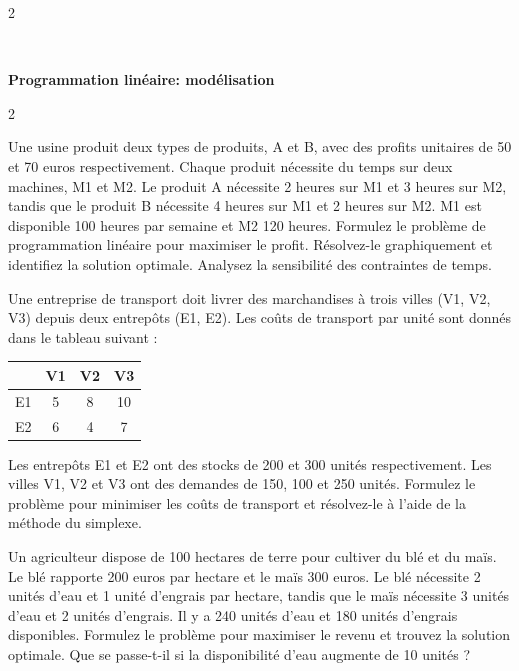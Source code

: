 \begin{multicols}{2}
\end{multicols}
\quad\\
\begin{center}
\textbf{{\large Programmation linéaire: modélisation}}
\end{center}
\begin{multicols}{2}

\begin{exercice}
	Une usine produit deux types de produits, A et B, avec des profits unitaires de 50 et 70 euros respectivement. Chaque produit nécessite du temps sur deux machines, M1 et M2. Le produit A nécessite 2 heures sur M1 et 3 heures sur M2, tandis que le produit B nécessite 4 heures sur M1 et 2 heures sur M2. M1 est disponible 100 heures par semaine et M2 120 heures. Formulez le problème de programmation linéaire pour maximiser le profit. Résolvez-le graphiquement et identifiez la solution optimale. Analysez la sensibilité des contraintes de temps.
\end{exercice}

\begin{exercice}
	Une entreprise de transport doit livrer des marchandises à trois villes (V1, V2, V3) depuis deux entrepôts (E1, E2). Les coûts de transport par unité sont donnés dans le tableau suivant :
	\begin{center}
		\begin{tabular}{c|ccc}
			& V1 & V2 & V3 \\
			\hline
			E1 & 5 & 8 & 10 \\
			E2 & 6 & 4 & 7 \\
		\end{tabular}
	\end{center}
	Les entrepôts E1 et E2 ont des stocks de 200 et 300 unités respectivement. Les villes V1, V2 et V3 ont des demandes de 150, 100 et 250 unités. Formulez le problème pour minimiser les coûts de transport et résolvez-le à l'aide de la méthode du simplexe.
\end{exercice}

\begin{exercice}
	Un agriculteur dispose de 100 hectares de terre pour cultiver du blé et du maïs. Le blé rapporte 200 euros par hectare et le maïs 300 euros. Le blé nécessite 2 unités d'eau et 1 unité d'engrais par hectare, tandis que le maïs nécessite 3 unités d'eau et 2 unités d'engrais. Il y a 240 unités d'eau et 180 unités d'engrais disponibles. Formulez le problème pour maximiser le revenu et trouvez la solution optimale. Que se passe-t-il si la disponibilité d'eau augmente de 10 unités ?
\end{exercice}


\end{multicols}
